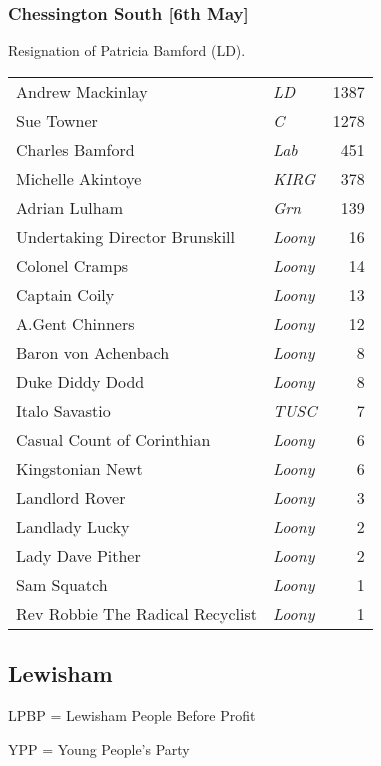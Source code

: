 \documentclass[a4paper,openany]{book}
\begin{document}
\begin{resultsiii}
\subsubsection*{Chessington South \hspace*{\fill}\nolinebreak[1]%
	\enspace\hspace*{\fill}
	[6th May]}


Resignation of Patricia Bamford (LD).

\noindent
\begin{tabular*}{\columnwidth}{@{\extracolsep{\fill}} p{} >{\itshape}l r @{\extracolsep{\fill}}}
	Andrew Mackinlay & LD & 1387\\
	Sue Towner & C & 1278\\
	Charles Bamford & Lab & 451\\
	Michelle Akintoye & KIRG & 378\\
	Adrian Lulham & Grn & 139\\
	Undertaking Director Brunskill & Loony & 16\\
	Colonel Cramps & Loony & 14\\
	Captain Coily & Loony & 13\\
	A.Gent Chinners & Loony & 12\\
	Baron von Achenbach & Loony & 8\\
	Duke Diddy Dodd & Loony & 8\\
	Italo Savastio & TUSC & 7\\
	Casual Count of Corinthian & Loony & 6\\
	Kingstonian Newt & Loony & 6\\
	Landlord Rover & Loony & 3\\
	Landlady Lucky & Loony & 2\\
	Lady Dave Pither & Loony & 2\\
	Sam Squatch & Loony & 1\\
	Rev Robbie The Radical Recyclist & Loony & 1\\
\end{tabular*}

\subsection*{Lewisham}

LPBP = Lewisham People Before Profit

YPP = Young People's Party


\end{resultsiii}
\end{document}
